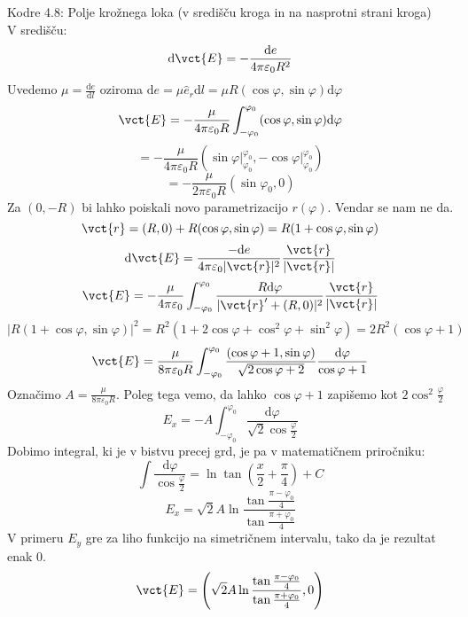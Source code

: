 \documentclass[a4paper]{article}
\newcommand{\dif}{\mathrm{d}}
\begin{document}
Kodre 4.8: Polje krožnega loka (v središču kroga in na nasprotni strani kroga) \\
V središču:
$$\dif\vct{E} = -\frac{\dif e}{4\pi\varepsilon_0R^2}$$
Uvedemo $\displaystyle{\mu = \frac{\dif e}{\dif l}}$ oziroma $\dif e = \mu \hat{e}_r \dif l = \mu R (\cos\varphi, \sin\varphi) \dif \varphi$
$$\vct{E} = -\frac{\mu}{4\pi\varepsilon_0R}\int_{-\varphi_0}^{\varphi_0}(\cos\varphi, \sin\varphi)\dif\varphi$$
$$= -\frac{\mu}{4\pi\varepsilon_0R}\left(\sin\varphi\Big|^{\varphi_0}_{\varphi_0}, -\cos\varphi\Big|^{\varphi_0}_{\varphi_0}\right)$$
$$= -\frac{\mu}{2\pi\varepsilon_0R}(\sin\varphi_0, 0)$$
Za $\left(0, -R\right)$ bi lahko poiskali novo parametrizacijo $r(\varphi)$. Vendar se nam ne da.
$$\vct{r} = (R, 0) + R(\cos\varphi, \sin\varphi) = R(1 + \cos\varphi, \sin\varphi)$$
$$\dif\vct{E} = \frac{-\dif e}{4\pi\varepsilon_0|\vct{r}|^2}\frac{\vct{r}}{|\vct{r}|}$$
$$\vct{E} = - \frac{\mu}{4\pi\varepsilon_0}\int_{-\varphi_0}^{\varphi_0} \frac{R\dif\varphi}{|\vct{r}' + (R, 0)|^2}\frac{\vct{r}}{|\vct{r}|}$$
$$|R(1 + \cos\varphi, \sin\varphi)|^2 = R^2(1 + 2\cos\varphi + \cos^2\varphi + \sin^2 \varphi) = 2R^2(\cos\varphi + 1)$$
$$\vct{E} = \frac{\mu}{8\pi\varepsilon_0R}\int_{-\varphi_0}^{\varphi_0}\frac{(\cos\varphi + 1, \sin\varphi)}{\sqrt{2\cos\varphi + 2}}\frac{\dif\varphi}{\cos\varphi + 1}$$
Označimo $\displaystyle{A = \frac{\mu}{8\pi\varepsilon_0R}}$. Poleg tega vemo, da lahko $\cos\varphi + 1$ zapišemo kot $\displaystyle{2\cos^2\frac{\varphi}{2}}$
$$E_x = -A \int_{-\varphi_0}^{\varphi_0}\frac{\dif\varphi}{\sqrt{2}\cos\frac{\varphi}{2}}$$
Dobimo integral, ki je v bistvu precej grd, je pa v matematičnem priročniku:
$$\int\frac{\dif\varphi}{\cos\frac{\varphi}{2}} = \ln\tan\left(\frac{x}{2} + \frac{\pi}{4}\right) + C$$
$$E_x = \sqrt{2}A\ln\frac{\tan\frac{\pi - \varphi_0}{4}}{\tan\frac{\pi + \varphi_0}{4}}$$
V primeru $E_y$ gre za liho funkcijo na simetričnem intervalu, tako da je rezultat enak 0.
$$\vct{E} = \left(\sqrt{2}A\ln\frac{\tan\frac{\pi - \varphi_0}{4}}{\tan\frac{\pi + \varphi_0}{4}}, 0\right)$$
\end{document}
